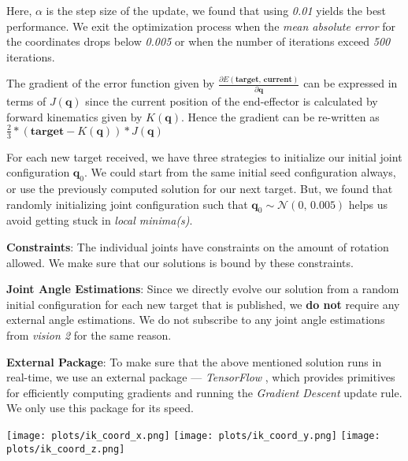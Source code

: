 \documentclass[11pt, a4paper]{article}
\begin{document}
    Here, $\alpha$ is the step size of the update, we found that using \textit{0.01} yields the best performance. We exit the optimization process when the \textit{mean absolute error} for the coordinates drops below \textit{0.005} or when the number of iterations exceed \textit{500} iterations.
    
    The gradient of the error function given by $\frac{\partial E(\textbf{target, current})}{\partial \textbf{q}}$ can be expressed in terms of $J(\textbf{q})$ since the current position of the end-effector is calculated by forward kinematics given by $K(\textbf{q})$. Hence the gradient can be re-written as $\frac{2}{3}*(\textbf{target} - K(\textbf{q})) * J(\textbf{q})$
    
    For each new target received, we have three strategies to initialize our initial joint configuration $\textbf{q}_0$. We could start from the same initial seed configuration always, or use the previously computed solution for our next target. But, we found that randomly initializing joint configuration such that $\textbf{q}_{0} \sim  \mathcal{N}(0,\, 0.005)$ helps us avoid getting stuck in \textit{local minima(s)}.
    
    \textbf{Constraints}: The individual joints have constraints on the amount of rotation allowed. We make sure that our solutions is bound by these constraints.

    \textbf{Joint Angle Estimations}: Since we directly evolve our solution from a random initial configuration for each new target that is published, we \textbf{do not} require any external angle estimations. We do not subscribe to any joint angle estimations from \textit{vision 2} for the same reason.
    
    \textbf{External Package}: To make sure that the above mentioned solution runs in real-time, we use an external package --- \textit{TensorFlow} \cite{tensorflow2015-whitepaper}, which provides primitives for efficiently computing gradients and running the \textit{Gradient Descent} update rule. We only use this package for its speed.

\begin{center}
    \texttt{[image: plots/ik\_coord\_x.png]}
    \texttt{[image: plots/ik\_coord\_y.png]}
    \texttt{[image: plots/ik\_coord\_z.png]}    
\end{center}

    
\printbibliography
\end{document}
